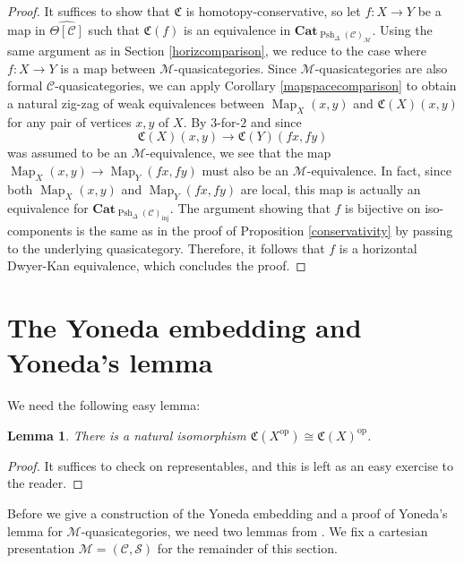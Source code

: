 \documentclass{amsart}
\numberwithin{equation}{section}
\theoremstyle{plain}   %
\newtheorem{lemma}[subsection]{Lemma}
\theoremstyle{remark}
\theoremstyle{plain}
\newcommand{\op}{\ensuremath{\mathrm{op}}}
\newcommand{\Cat}{\ensuremath{\mathbf{Cat}}}
\DeclareMathOperator{\Map}{Map}
\newcommand{\C}{\ensuremath{\mathcal{C}}}
\newcommand{\M}{\ensuremath{\mathcal{M}}}
\newcommand{\setS}{\ensuremath{\mathscr{S}}}
\newcommand{\cellset}{\ensuremath{\widehat{\Theta[\mathcal{C}]}}}
\newcommand{\spsh}{\ensuremath{\operatorname{Psh}_\Delta(\mathcal{C})}}
\begin{document}
\begin{proof} It suffices to show that \(\mathfrak{C}\) is homotopy-conservative, so let \(f:X\to Y\) be a map in \(\cellset\) such that \(\mathfrak{C}(f)\) is an equivalence in \(\Cat_{\spsh_{\M}}\). Using the same argument as in Section \ref{horizcomparison}, we reduce to the case where \(f:X\to Y\) is a map between \(\M\)-quasicategories.  Since \(\M\)-quasicategories are also formal \(\C\)-quasicategories, we can apply Corollary \ref{mapspacecomparison} to obtain a natural zig-zag of weak equivalences between \(\Map_X(x,y)\) and \(\mathfrak{C}(X)(x,y)\) for any pair of vertices \(x,y\) of \(X\).  By \(3\)-for-\(2\) and since \[\mathfrak{C}(X)(x,y) \to \mathfrak{C}(Y)(fx,fy)\] was assumed to be an \(\M\)-equivalence, we see that the map \(\Map_X(x,y)\to \Map_Y(fx,fy)\) must also be an \(\M\)-equivalence.  In fact, since both \(\Map_X(x,y)\) and \(\Map_Y(fx,fy)\) are local, this map is actually an equivalence for \(\Cat_{\spsh_{\mathrm{inj}}}\).  The argument showing that \(f\) is bijective on iso-components is the same as in the proof of Proposition \ref{conservativity} by passing to the underlying quasicategory.  Therefore, it follows that \(f\) is a horizontal Dwyer-Kan equivalence, which concludes the proof.
\end{proof}
\section{The Yoneda embedding and Yoneda's lemma}
We need the following easy lemma:
\begin{lemma} There is a natural isomorphism \(\mathfrak{C}(X^\op)\cong \mathfrak{C}(X)^\op\).  
\end{lemma} 
\begin{proof}
	It suffices to check on representables, and this is left as an easy exercise to the reader.
\end{proof}
Before we give a construction of the Yoneda embedding and a proof of Yoneda's lemma for \(\M\)-quasicategories, we need two lemmas from \cite{htt}.   We fix a cartesian presentation \(\mathcal{M}=(\C,\setS)\) for the remainder of this section.
\end{document}
